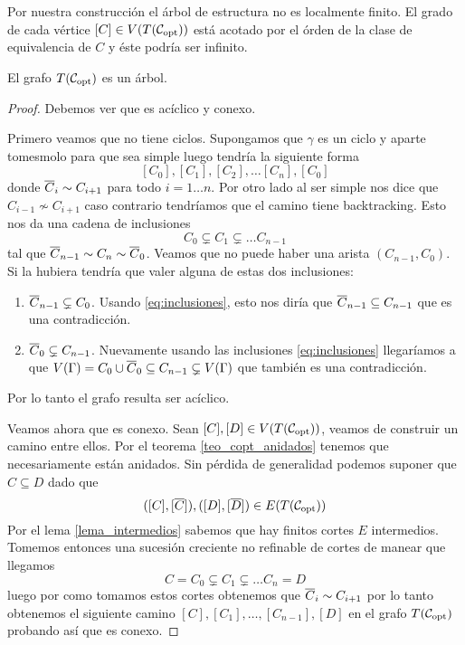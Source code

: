\documentclass[tesis.tex]{subfiles}
\begin{document}
\begin{obs}
	Por nuestra construcción el árbol de estructura no es localmente finito.
	El grado de cada vértice $[C] \in V(T({\cal C}_{\text{opt}}))$ está acotado por el órden de la clase de equivalencia de $C$ y éste podría ser infinito.
\end{obs}

\begin{prop}
	El grafo $T({\cal C}_{\text{opt}})$ es un árbol.
\end{prop}

\begin{proof}
	Debemos ver que es acíclico y conexo.
	
	Primero veamos que no tiene ciclos.
	Supongamos que $\gamma$	es un ciclo y aparte tomesmolo para que sea simple luego tendría la siguiente forma
	\[
		[C_0], [C_1], [C_2], \dots [C_{n}], [C_0]
	\]
	donde $\overline C_{i} \sim C_{i+1}$ para todo $i=1 \dots n$.
	Por otro lado al ser simple nos dice que $C_{i-1} \nsim C_{i+1}$ caso contrario tendríamos que el camino tiene backtracking.
	Esto nos da una cadena de inclusiones
	\begin{equation}\label{eq:inclusiones}
			C_0 \subsetneq C_1 \subsetneq \dots C_{n-1}
	\end{equation}
	tal que $\overline C_{n-1} \sim C_n \sim \overline C_0$.
	Veamos que no puede haber una arista $(C_{n-1}, C_0)$.
	Si la hubiera tendría que valer alguna de estas dos inclusiones:
	\begin{enumerate}
		\item $\overline C_{n-1} \subsetneq C_0$.
		Usando \ref{eq:inclusiones}, esto nos diría que $\overline C_{n-1} \subseteq C_{n-1}$ que es una contradicción.
		\item $\overline C_{0} \subsetneq C_{n-1}$.
		Nuevamente usando las inclusiones \ref{eq:inclusiones} llegaríamos a que $V(\Gamma) = C_0 \cup \overline C_0 \subseteq C_{n-1} \subsetneq V(\Gamma)$ que también es una contradicción.
	\end{enumerate}
	Por lo tanto el grafo resulta ser acíclico.
	
	Veamos ahora que es conexo.
	Sean $[C], [D] \in V(T({\cal C}_{\text{opt}}))$, veamos de construir un camino entre ellos.
	Por el teorema \ref{teo_copt_anidados} tenemos que necesariamente están anidados.
	Sin pérdida de generalidad podemos suponer que $C \subseteq D$ dado que
	\[
	([C], [\overline C]), ([D],[\overline D]) \in E(T({\cal C}_{\text{opt}}))
	\]
	Por el lema \ref{lema_intermedios} sabemos que hay finitos cortes $E$ intermedios.
	Tomemos entonces una sucesión creciente no refinable de cortes de manear que llegamos 
	\[
		C=C_0 \subsetneq C_1 \subsetneq \dots C_n = D
	\]
	luego por como tomamos estos cortes obtenemos que $\overline C_i \sim C_{i+1}$ por lo tanto obtenemos el siguiente camino $[C],[C_1], \dots, [C_{n-1}],[D]$ en el grafo $T({\cal C}_{\text{opt}})$ probando así que es conexo.	
\end{proof}
\end{document}
